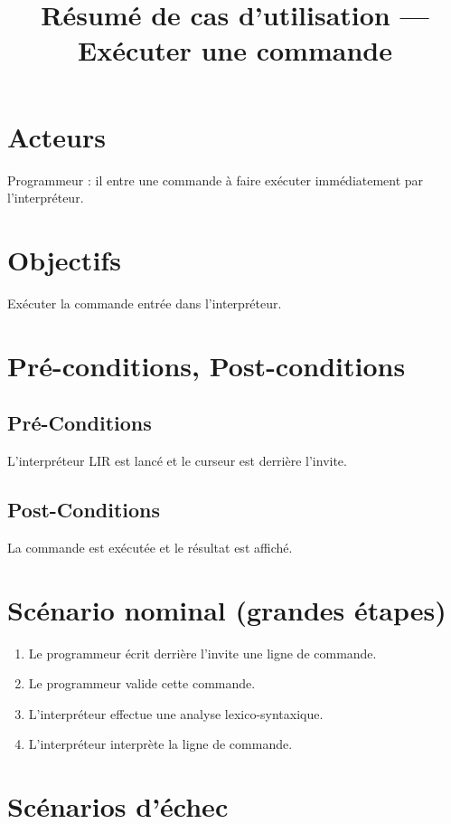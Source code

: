 \documentclass[12pt,a4paper]{article}
\title{Résumé de cas d'utilisation --- Exécuter une commande}
\date{} %
\author{} %
\begin{document}
    \maketitle

    \section{Acteurs}
    Programmeur : il entre une commande à faire exécuter immédiatement par l'interpréteur.

    \section{Objectifs}
    Exécuter la commande entrée dans l'interpréteur.

    \section{Pré-conditions, Post-conditions}

    \subsection{Pré-Conditions}
    L'interpréteur LIR est lancé et le curseur est derrière l'invite.

    \subsection{Post-Conditions}
    La commande est exécutée et le résultat est affiché.

    \section{Scénario nominal (grandes étapes)}
        \begin{enumerate}
            \item Le programmeur écrit derrière l'invite une ligne de commande.
            \item Le programmeur valide cette commande.
            \item L'interpréteur effectue une analyse lexico-syntaxique.
            \item L'interpréteur interprète la ligne de commande.
        \end{enumerate}

    \section{Scénarios d'échec}
\end{document}
